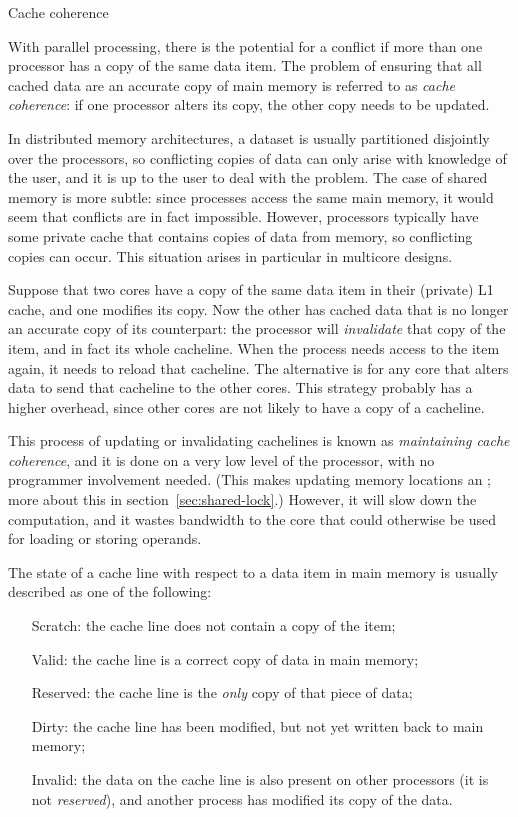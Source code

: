  {Cache coherence}
\label{sec:coherence}

With parallel processing, there is the potential for a conflict if more
than one processor has a copy of the same data item. The problem of
ensuring that all cached data are an accurate copy of main memory is
referred to as \emph{cache coherence}: if one processor alters
its copy, the other copy needs to be updated.

In distributed memory architectures, a dataset is usually partitioned
disjointly over the processors, so conflicting copies of data can only
arise with knowledge of the user, and it is up to the user to
deal with the problem. The case of shared memory is more subtle: since
processes access the same main memory, it would seem that conflicts
are in fact impossible. However, processors typically have some private
cache that contains copies of data from memory, so conflicting
copies can occur.  This situation arises in particular in multicore
designs.

Suppose that two cores have a copy of the same data item in their
(private) L1 cache, and one modifies its copy. Now the other has
cached data that is no longer an accurate copy of its counterpart: the
processor will \emph{invalidate} that
copy of the item, and in fact its whole cacheline. When the process
needs access to the item again, it needs to reload that cacheline.
The alternative is for any core that alters data to send that
cacheline to the other cores. This strategy probably has a higher overhead,
since other cores are not likely to have a copy of a cacheline.

This process of updating or invalidating cachelines
is known as \emph{maintaining cache coherence}, and it is done on
a very low level of the processor, with no programmer involvement
needed. (This makes updating memory locations an ; more about this in section~\ref{sec:shared-lock}.)
However, it will slow down the computation, and it wastes bandwidth to
the core that could otherwise be used for loading or storing operands.

The state of a cache line with respect to a data item in main memory
is usually described as one of the following:
\begin{itemize}
\item[Scratch:] the cache line does not contain a copy of the item;
\item[Valid:] the cache line is a correct copy of data in main memory;
\item[Reserved:] the cache line is the \emph{only} copy of that piece
  of data;
\item[Dirty:] the cache line has been modified, but not yet written
  back to main memory;
\item [Invalid:] the data on the cache line is also present on other
  processors (it is not \emph{reserved}), and another process has
  modified its copy of the data.
\end{itemize}

